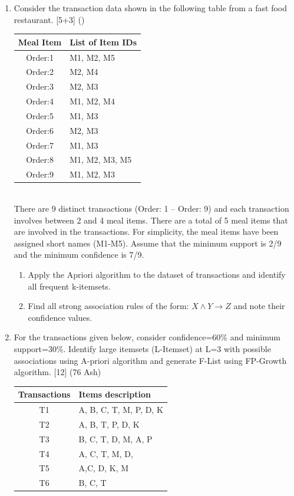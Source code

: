 \documentclass[12pt]{article}
\begin{document}
\begin{enumerate}[topsep=0pt, noitemsep]
      \item Consider the transaction data shown in the following table from a fast food restaurant. \hfill [5+3] ()\\
        \small
        \begin{tabular}{|c|l|}
          \hline
          Meal Item & List of Item IDs \\ \hline
          Order:1 & M1, M2, M5 \\ \hline
          Order:2 & M2, M4 \\ \hline
          Order:3 & M2, M3 \\ \hline
          Order:4 & M1, M2, M4 \\ \hline
          Order:5 & M1, M3 \\ \hline
          Order:6 & M2, M3 \\ \hline
          Order:7 & M1, M3 \\ \hline
          Order:8 & M1, M2, M3, M5 \\ \hline
          Order:9 & M1, M2, M3 \\ \hline
        \end{tabular}
        \normalsize\\
        There are 9 distinct transactions (Order: 1 -- Order: 9) and each transaction involves between 2 and 4 meal items. There are a total of 5 meal items that are involved in the transactions. For simplicity, the meal items have been assigned short names (M1-M5). Assume that the minimum support is 2/9 and the minimum confidence is 7/9.
        \begin{enumerate}[label=(\alph*),topsep=2pt,noitemsep]
          \item Apply the Apriori algorithm to the dataset of transactions and identify all frequent k-itemsets.
          \item Find all strong association rules of the form: $X \wedge Y \rightarrow Z$ and note their confidence values.
        \end{enumerate}

      \item For the transactions given below, consider confidence=60\% and minimum support=30\%. Identify large itemsets (L-Itemset) at L=3 with possible associations using A-priori algorithm and generate F-List using FP-Growth algorithm. \hfill [12] (76 Ash)\\
        \small
        \begin{tabular}{|c|l|}
          \hline
          Transactions & Items description \\ \hline
          T1 & A, B, C, T, M, P, D, K \\ \hline
          T2 & A, B, T, P, D, K \\ \hline
          T3 & B, C, T, D, M, A, P \\ \hline
          T4 & A, C, T, M, D, \\ \hline
          T5 & A,C, D, K, M \\ \hline
          T6 & B, C, T \\ \hline
        \end{tabular}
        \normalsize


\end{enumerate}
\end{document}
